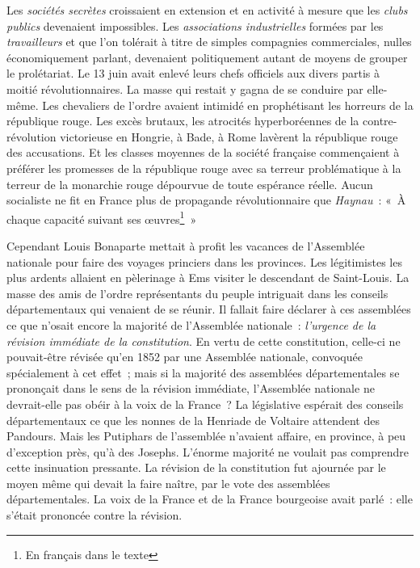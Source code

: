 \documentclass[twoside]{book} %
\begin{document}
Les \emph{sociétés secrètes} croissaient en extension et en activité à mesure que les \emph{clubs publics} devenaient impossibles. Les \emph{associations industrielles} formées par les \emph{travailleurs} et que l’on tolérait à titre de simples compagnies commerciales, nulles économiquement parlant, devenaient politiquement autant de moyens de grouper le prolétariat. Le 13 juin avait enlevé leurs chefs officiels aux divers partis à moitié révolutionnaires. La masse qui restait y gagna de se conduire par elle-même. Les chevaliers de l’ordre avaient intimidé en prophétisant les horreurs de la république rouge. Les excès brutaux, les atrocités hyperboréennes de la contre-révolution victorieuse en Hongrie, à Bade, à Rome lavèrent la république rouge des accusations. Et les classes moyennes de la société française commençaient à préférer les promesses de la république rouge avec sa terreur problématique à la terreur de la monarchie rouge dépourvue de toute espérance réelle. Aucun socialiste ne fit en France plus de propagande révolutionnaire que \emph{Haynau} : « À chaque capacité suivant ses œuvres\footnote{En français dans le texte} »\par
Cependant Louis Bonaparte mettait à profit les vacances de l’Assemblée nationale pour faire des voyages princiers dans les provinces. Les légitimistes les plus ardents allaient en pèlerinage à Ems visiter le descendant de Saint-Louis. La masse des amis de l’ordre représentants du peuple intriguait dans les conseils départementaux qui venaient de se réunir. Il fallait faire déclarer à ces assemblées ce que n’osait encore la majorité de l’Assemblée nationale : \emph{l’urgence de la révision immédiate de la constitution}. En vertu de cette constitution, celle-ci ne pouvait-être révisée qu’en 1852 par une Assemblée nationale, convoquée spécialement à cet effet ; mais si la majorité des assemblées départementales se prononçait dans le sens de la révision immédiate, l’Assemblée nationale ne devrait-elle pas obéir à la voix de la France ? La législative espérait des conseils départementaux ce que les nonnes de la Henriade de Voltaire attendent des Pandours. Mais les Putiphars de l’assemblée n’avaient affaire, en province, à peu d’exception près, qu’à des Josephs. L’énorme majorité ne voulait pas comprendre cette insinuation pressante. La révision de la constitution fut ajournée par le moyen même qui devait la faire naître, par le vote des assemblées départementales. La voix de la France et de la France bourgeoise avait parlé : elle s’était prononcée contre la révision.\par
\end{document}
